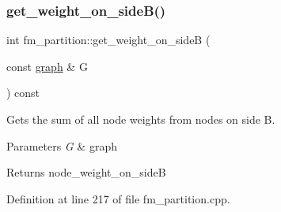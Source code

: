 \subsubsection{\texorpdfstring{get\+\_\+weight\+\_\+on\+\_\+side\+B()}{get\_weight\_on\_sideB()}}
{\footnotesize\ttfamily int fm\+\_\+partition\+::get\+\_\+weight\+\_\+on\+\_\+sideB (\begin{DoxyParamCaption}\item[{const \mbox{\hyperlink{classgraph}{graph}} \&}]{G }\end{DoxyParamCaption}) const}

Gets the sum of all node weights from nodes on side B.


\begin{DoxyParams}{Parameters}
{\em G} & graph \\
\hline
\end{DoxyParams}
\begin{DoxyReturn}{Returns}
{\ttfamily node\+\_\+weight\+\_\+on\+\_\+sideB} 
\end{DoxyReturn}


Definition at line 217 of file fm\+\_\+partition.\+cpp.


